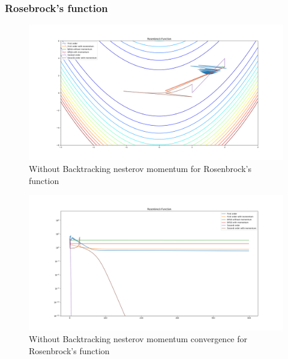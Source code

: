 \documentclass{article}
\begin{document}
\subsubsection{Rosebrock's function}
\begin{center}
\begin{figure}[H]
	\includegraphics[width=\linewidth]{../Images/rosenbrocknesterov.png}
	\caption{Without Backtracking nesterov momentum for Rosenbrock's function}
	\label{fig:Without Backtracking nesterov momentum for Rosenbrock's function}
\end{figure}

\begin{figure}[H]
	\includegraphics[width=\linewidth]{../Images/rosenbrocknesterov1.png}
	\caption{Without Backtracking nesterov momentum convergence for Rosenbrock's function}
	\label{fig:Without Backtracking nesterov momentum convergence for Rosenbrock's function}
\end{figure}


\end{center}
\end{document}
